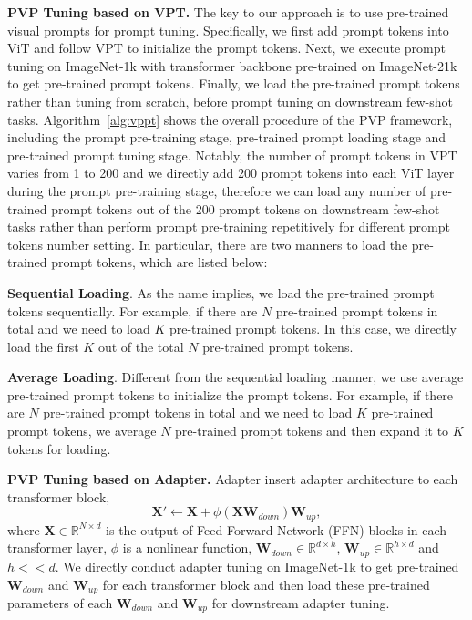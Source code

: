 \documentclass[10pt,journal,letterpaper,compsoc]{IEEEtran}
\newcommand{\myPara}[1]{\vspace{10pt}\noindent\textbf{#1.}\quad}
\begin{document}
\myPara{PVP Tuning based on VPT}
The key to our approach is to use pre-trained visual prompts for prompt tuning. Specifically, we first add prompt tokens into ViT and follow VPT to initialize the prompt tokens. Next, we execute prompt tuning on ImageNet-1k with transformer backbone pre-trained on ImageNet-21k to get pre-trained prompt tokens. Finally, we load the pre-trained prompt tokens rather than tuning from scratch, before prompt tuning on downstream few-shot tasks. Algorithm~\ref{alg:vppt} shows the overall procedure of the PVP framework, including the prompt pre-training stage, pre-trained prompt loading stage and pre-trained prompt tuning stage. Notably, the number of prompt tokens in VPT varies from 1 to 200 and we directly add 200 prompt tokens into each ViT layer during the prompt pre-training stage, therefore we can load any number of pre-trained prompt tokens out of the 200 prompt tokens on downstream few-shot tasks rather than perform prompt pre-training repetitively for different prompt tokens number setting. In particular, there are two manners to load the pre-trained prompt tokens, which are listed below:

\textbf{Sequential Loading}. As the name implies, we load the pre-trained prompt tokens sequentially. For example, if there are $N$ pre-trained prompt tokens in total and we need to load $K$ pre-trained prompt tokens. In this case, we directly load the first $K$ out of the total $N$ pre-trained prompt tokens.

\textbf{Average Loading}. Different from the sequential loading manner, we use average pre-trained prompt tokens to initialize the prompt tokens. For example, if there are $N$ pre-trained prompt tokens in total and we need to load $K$ pre-trained prompt tokens, we average $N$ pre-trained prompt tokens and then expand it to $K$ tokens for loading.

\myPara{PVP Tuning based on Adapter}
Adapter insert adapter architecture to each transformer block, $$\boldsymbol{X}'\leftarrow\boldsymbol{X}+\phi(\boldsymbol{X}\boldsymbol{W}_{down})\boldsymbol{W}_{up},$$ where $\boldsymbol{X}\in \mathbb{R}^{N\times d}$ is the output of Feed-Forward Network (FFN) blocks in each transformer layer, $\phi$ is a nonlinear function, $\boldsymbol{W}_{down}\in \mathbb{R}^{d\times h}$, $\boldsymbol{W}_{up}\in \mathbb{R}^{h\times d}$ and $h << d$. We directly conduct adapter tuning on ImageNet-1k to get pre-trained $\boldsymbol{W}_{down}$ and $\boldsymbol{W}_{up}$ for each transformer block and then load these pre-trained parameters of each $\boldsymbol{W}_{down}$ and $\boldsymbol{W}_{up}$ for downstream adapter tuning.
\end{document}
